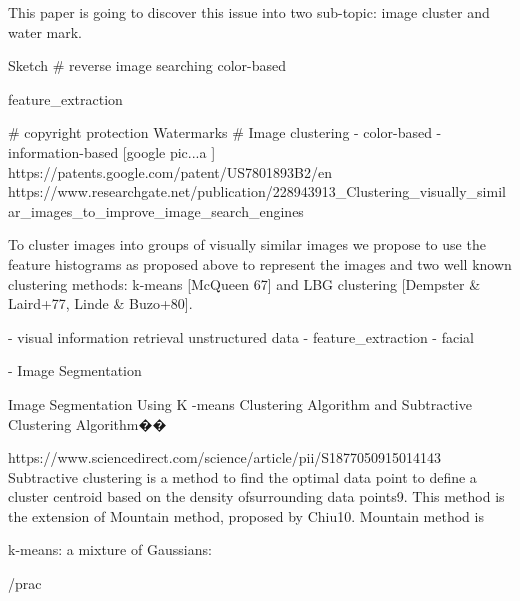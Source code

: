 This paper is going to discover this issue into two sub-topic: image cluster and water mark.

Sketch
# reverse image searching
    color-based

    feature_extraction   

# copyright protection
    Watermarks  
# Image clustering
    - color-based
    - information-based [google pic...a ]
    https://patents.google.com/patent/US7801893B2/en  
    https://www.researchgate.net/publication/228943913_Clustering_visually_similar_images_to_improve_image_search_engines  {

To cluster images into groups of visually similar images we propose to use the feature histograms as proposed above to represent the images and two well known clustering methods: k-means [McQueen 67] and LBG clustering [Dempster & Laird+77, Linde & Buzo+80]. 
    }
        - visual information retrieval
         unstructured data
        - feature_extraction   
        - facial 

        - Image Segmentation  

Image Segmentation Using K -means Clustering Algorithm and Subtractive Clustering Algorithm��{
https://www.sciencedirect.com/science/article/pii/S1877050915014143
Subtractive clustering is a method to find the optimal data point to define a cluster centroid based on the density ofsurrounding data points9. This method is the extension of Mountain method, proposed by Chiu10. Mountain method is

}

k-means: 
a mixture of Gaussians: 

/prac